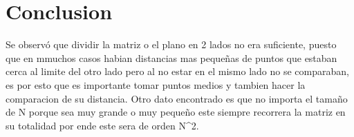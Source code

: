 \section{Conclusion}
Se observó que dividir la matriz o el plano en 2 lados no era suficiente, puesto que en mmuchos casos habian distancias mas pequeñas de puntos que estaban cerca al limite del otro lado pero al no estar en el mismo lado no se comparaban, es por esto que es importante tomar puntos medios y tambien hacer la comparacion de su distancia. Otro dato encontrado es que no importa el tamaño de N porque sea muy grande o muy pequeño este siempre recorrera la matriz en su totalidad por ende este sera de orden N^2.